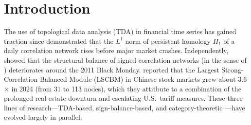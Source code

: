 \documentclass[11pt]{article}
\begin{document}
\begin{abstract}
complement rather than a pure return-enhancement strategy. A leave-one-out
analysis across four independent shocks identifies a persistent cross-asset core
(natural gas, copper, the China index) that anchors the divergence signal
regardless of shock type, while the peripheral contributors rotate per event ---
a robust, shock-independent finding that contrasts with the shock-dependent
classifier behavior above. The work bridges three previously separate research lines:
TDA $\times$ finance \cite{gidea2017topological, majumdar2024multi},
signed-balance $\times$ finance \cite{ferreira2021loss, wang2025core}, and
category-theoretic finance \cite{adachi2026martingale}, providing a third
sign-based indicator that is partially independent from Walk-based $K$
\cite{ferreira2021loss} and frustration index \cite{aref2018frustration}.
\end{abstract}

\section{Introduction}

The use of topological data analysis (TDA) in financial time series has gained
traction since \citet{gidea2017topological} demonstrated that the $L^1$ norm of
persistent homology $H_1$ of a daily correlation network rises before major
market crashes. Independently, \citet{ferreira2021loss} showed that the
structural balance of signed correlation networks (in the sense of
\citet{heider1946attitudes, cartwright1956structural}) deteriorates around the
2011 Black Monday. \citet{wang2025core} reported that the Largest Strong-Correlation
Balanced Module (LSCBM) in Chinese stock markets grew about 3.6$\times$ in 2024
(from 31 to 113 nodes), which they attribute to a combination of the prolonged
real-estate downturn and escalating U.S.\ tariff measures. These three lines of research---TDA-based,
sign-balance-based, and category-theoretic
\cite{adachi2026martingale}---have evolved largely in parallel.
\end{document}
